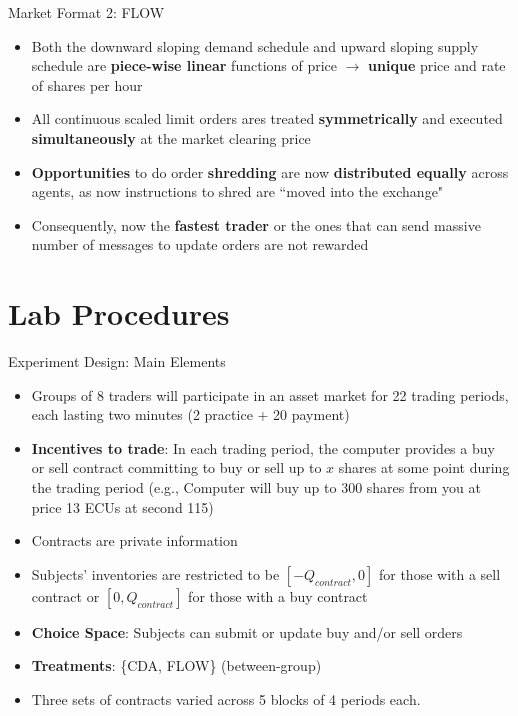 \documentclass[10pt]{beamer}
\begin{document}
\begin{frame}{Market Format 2: FLOW}
    \begin{itemize}
        \item Both the downward sloping demand schedule and upward sloping supply schedule are \textbf{piece-wise linear} functions of price $\rightarrow$ \textbf{unique} price and rate of shares per hour
        \item All continuous scaled limit orders ares treated \textbf{symmetrically} and executed \textbf{simultaneously} at the market clearing price
        \item \textbf{Opportunities} to do order \textbf{shredding} are now \textbf{distributed equally} across agents, as now instructions to shred are ``moved into the exchange"
        \item Consequently, now the \textbf{fastest trader} or the ones that can send massive number of messages to update orders are not rewarded
    \end{itemize}
\end{frame}

\section{Lab Procedures}

\begin{frame}{Experiment Design: Main Elements}
    \begin{itemize}
        \item Groups of 8 traders will participate in an asset market for 22 trading periods, each lasting two minutes (2 practice + 20 payment)
        \item \textbf{Incentives to trade}: In each trading period, the computer provides a buy or sell contract committing to buy or sell up to $x$ shares at some point during the trading period (e.g., Computer will buy up to 300 shares from you at price 13 ECUs at second 115)
        \item Contracts are private information
        \item Subjects' inventories are restricted to be $[-Q_{contract}, 0]$ for those with a sell contract or $[0, Q_{contract}]$ for those with a buy contract
        \item \textbf{Choice Space}: Subjects can submit or update buy and/or sell orders
        \item \textbf{Treatments}: \{CDA, FLOW\} (between-group)
        \item Three sets of contracts varied across 5 blocks of 4 periods each. 
    \end{itemize}
\end{frame}
\end{document}
